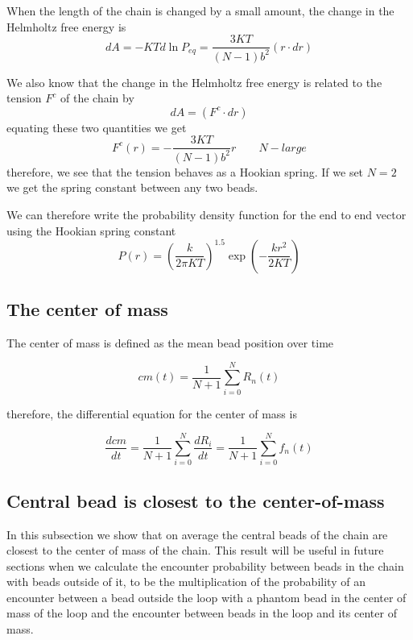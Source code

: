 \documentclass{report}
\begin{document}
When the length of the chain is changed by a small amount, the change in the Helmholtz free energy is 
\begin{equation*}
dA=-KTd\ln{P_{eq}}=\frac{3KT}{(N-1)b^2}(r\cdot dr)
\end{equation*}

We also know that the change in the Helmholtz free energy is related to the tension $F^c$ of the chain by 
\begin{equation*}
dA=(F^c\cdot dr)
\end{equation*}
equating these two quantities we get 
\begin{equation*}
F^c(r) = -\frac{3KT}{(N-1)b^2}r	 \qquad N-large
\end{equation*}
therefore, we see that the tension behaves as a Hookian spring. If we set $N=2$ we get the spring constant between any two beads.

We can therefore write the probability density function for the end to end vector using the Hookian spring constant
\begin{equation*}
P(r)= \left(\frac{k}{2\pi KT}\right)^{1.5}\exp\left(-\frac{k r^2}{2KT}\right)
\end{equation*}

\subsection{The center of mass}\label{subsection_theCenterOfMass}

The center of mass is defined as the mean bead position over time 

\begin{equation*}
cm(t) = \frac{1}{N+1}\sum_{i=0}^N{R_n(t)}
\end{equation*}

therefore, the differential equation for the center of mass is 

\begin{equation*}
\frac{dcm}{dt}=\frac{1}{N+1}\sum_{i=0}^N{\frac{dR_i}{dt}}= \frac{1}{N+1}\sum_{i=0}^Nf_n(t)
\end{equation*}

\subsection{Central bead is closest to the center-of-mass}\label{subsection_centralbeadClosestToCenterOfMass}
In this subsection we show that on average the central beads of the chain are closest to the center of mass of the chain. This result will be useful in future sections when we calculate the encounter probability between beads in the chain with beads outside of it, to be the multiplication of the probability of an encounter between a bead outside the loop with a phantom bead in the center of mass of the loop and the encounter between beads in the loop and its center of mass. 
\end{document}
